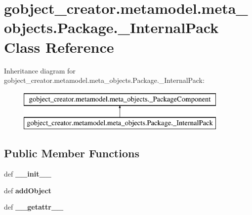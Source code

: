 \hypertarget{classgobject__creator_1_1metamodel_1_1meta__objects_1_1Package_1_1__InternalPack}{
\section{gobject\_\-creator.metamodel.meta\_\-objects.Package.\_\-InternalPack Class Reference}
\label{classgobject__creator_1_1metamodel_1_1meta__objects_1_1Package_1_1__InternalPack}
}
Inheritance diagram for gobject\_\-creator.metamodel.meta\_\-objects.Package.\_\-InternalPack:\begin{figure}[H]
\begin{center}
\leavevmode
\includegraphics[height=2cm]{classgobject__creator_1_1metamodel_1_1meta__objects_1_1Package_1_1__InternalPack}
\end{center}
\end{figure}
\subsection*{Public Member Functions}
\begin{DoxyCompactItemize}
\item 
\hypertarget{classgobject__creator_1_1metamodel_1_1meta__objects_1_1Package_1_1__InternalPack_a435cd6e92135a42e875f865d51d56d88}{
def {\bfseries \_\-\_\-init\_\-\_\-}}
\label{classgobject__creator_1_1metamodel_1_1meta__objects_1_1Package_1_1__InternalPack_a435cd6e92135a42e875f865d51d56d88}

\item 
\hypertarget{classgobject__creator_1_1metamodel_1_1meta__objects_1_1Package_1_1__InternalPack_a0466bb89c545fdc4bd7158689bcb53af}{
def {\bfseries addObject}}
\label{classgobject__creator_1_1metamodel_1_1meta__objects_1_1Package_1_1__InternalPack_a0466bb89c545fdc4bd7158689bcb53af}

\item 
\hypertarget{classgobject__creator_1_1metamodel_1_1meta__objects_1_1Package_1_1__InternalPack_a19f1a2bd3a7163d0fdb2daa02ade66e2}{
def {\bfseries \_\-\_\-getattr\_\-\_\-}}
\label{classgobject__creator_1_1metamodel_1_1meta__objects_1_1Package_1_1__InternalPack_a19f1a2bd3a7163d0fdb2daa02ade66e2}

\end{DoxyCompactItemize}
